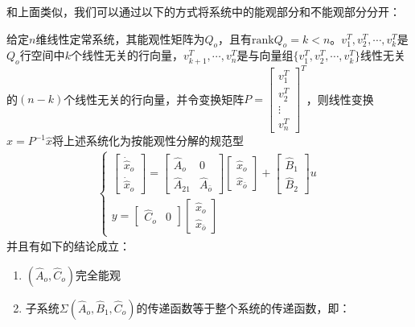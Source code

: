 和上面类似，我们可以通过以下的方式将系统中的能观部分和不能观部分分开：
\begin{anymark}[能观性结构分解]
    给定$n$维线性定常系统，其能观性矩阵为$Q_o$，且有$\text{rank} Q_o = k < n$。$v_1^T,v_2^T,\cdots,v_k^T$是$Q_o$行空间中$k$个线性无关的行向量，$v_{k+1}^T,\cdots,v_n^T$是与向量组$\{v_1^T,v_2^T,\cdots,v_k^T\}$线性无关的$(n-k)$个线性无关的行向量，并令变换矩阵$P = \begin{bmatrix}
        v_1^T \\ v_2^T \\ \vdots \\ v_n^T
    \end{bmatrix}^T$，则线性变换$x = P^{-1} \hat{x}$将上述系统化为按能观性分解的规范型
    \begin{gather*}
        \begin{cases}
            \begin{bmatrix}
                \dot{\hat{x}}_o \\ \dot{\hat{x}}_o
            \end{bmatrix} = \begin{bmatrix}
                \hat{A}_o & 0 \\
                \hat{A}_{21} & \hat{A}_{\bar{o}}
            \end{bmatrix} \begin{bmatrix}
                \hat{x}_o \\ \hat{x}_{\bar{o}}
            \end{bmatrix} + \begin{bmatrix}
                \hat{B}_1 \\ \hat{B}_2
            \end{bmatrix} u\\
            y = \begin{bmatrix}
                \hat{C}_o & 0
            \end{bmatrix} \begin{bmatrix}
                \hat{x}_o \\ \hat{x}_{\bar{o}}
            \end{bmatrix}
        \end{cases}
    \end{gather*}
    并且有如下的结论成立：
    \begin{enumerate}
        \item $(\hat{A}_o, \hat{C}_o)$完全能观
        \item 子系统$\Sigma(\hat{A}_o,\hat{B}_1,\hat{C}_o)$的传递函数等于整个系统的传递函数，即：

\end{enumerate}
\end{anymark}
